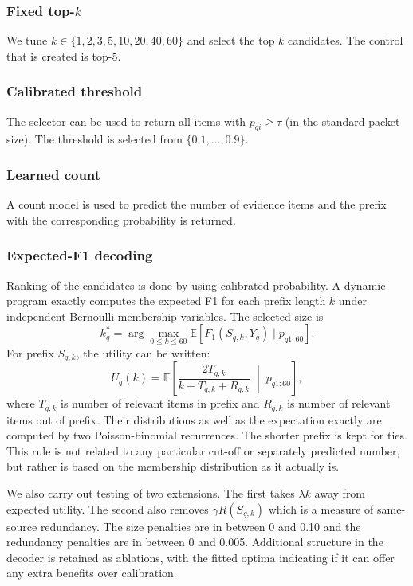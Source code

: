 \subsubsection{\texorpdfstring{Fixed top-$k$}{Fixed top-k}}
We tune $k \in \{1,2,3,5,10,20,40,60\}$ and select the top $k$ candidates. The control that is created is top-5.

\subsubsection{Calibrated threshold}
The selector can be used to return all items with $p_{qi} \geq \tau$ (in the standard packet size). The threshold is selected from $\{0.1, \ldots, 0.9\}$.

\subsubsection{Learned count}
A count model is used to predict the number of evidence items and the prefix with the corresponding probability is returned.

\subsubsection{Expected-F1 decoding}
Ranking of the candidates is done by using calibrated probability. A dynamic program exactly computes the expected F1 for each prefix length $k$ under independent Bernoulli membership variables. The selected size is
\begin{equation}
k_q^*=\arg\max_{0\leq k\leq 60}
\mathbb{E}\!\left[F_1(S_{q,k},Y_q)\mid p_{q1:60}\right].
\label{eq:expected-f1}
\end{equation}
For prefix $S_{q,k}$, the utility can be written:
\begin{equation}
U_q(k)=\mathbb{E}\!\left[
\frac{2T_{q,k}}{k+T_{q,k}+R_{q,k}}
\;\middle|\;p_{q1:60}\right],
\label{eq:expected-f1-utility}
\end{equation}
where $T_{q,k}$ is number of relevant items in prefix and $R_{q,k}$ is number of relevant items out of prefix. Their distributions as well as the expectation exactly are computed by two Poisson-binomial recurrences. The shorter prefix is kept for ties. This rule is not related to any particular cut-off or separately predicted number, but rather is based on the membership distribution as it actually is.

We also carry out testing of two extensions. The first takes $\lambda k$ away from expected utility. The second also removes $\gamma R(S_{q,k})$ which is a measure of same-source redundancy. The size penalties are in between 0 and 0.10 and the redundancy penalties are in between 0 and 0.005. Additional structure in the decoder is retained as ablations, with the fitted optima indicating if it can offer any extra benefits over calibration.

